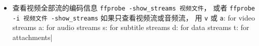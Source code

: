 
\begin{issues}
\issueDraft
\end{issues}

\begin{itemize}
\item 查看视频全部流的编码信息 \verb|ffprobe -show_streams 视频文件|， 或者 \verb|ffprobe -i 视频文件 -show_streams| 如果只查看视频流或音频流， 用 \verb|v| 或 \verb|a|: for video streams
a: for audio streams
s: for subtitle streams
d: for data streams
t: for attachments|
\end{itemize}
